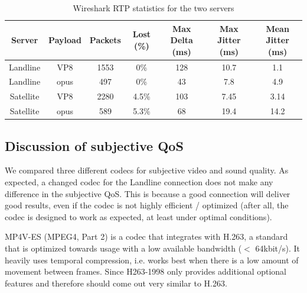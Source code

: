 \documentclass[parskip=full]{scrartcl}
\begin{document}
\begin{table}
    \centering
    \begin{tabular}{c c c c c c c}
       \hline
       Server & Payload & Packets & Lost (\%) & Max Delta (ms) & Max Jitter (ms) & Mean Jitter (ms)\\
       \hline
       Landline & VP8 & 1553 & 0\% & 128 & 10.7 & 1.1 \\
       Landline & opus & 497 & 0\% & 43 & 7.8 & 4.9 \\
       Satellite & VP8 & 2280 & 4.5\% & 103 & 7.45 & 3.14\\
       Satellite & opus & 589 & 5.3\% & 68 & 19.4 & 14.2\\
       \hline
    \end{tabular}
    \caption{Wireshark RTP statistics for the two servers}
    \label{tbl:rtpStatistics}
\end{table}


\subsection{Discussion of subjective QoS}
We compared three different codecs for subjective video and sound quality.
As expected, a changed codec for the Landline connection does not make any difference in the subjective QoS.
This is because a good connection will deliver good results, even if the codec is not highly efficient / optimized (after all, the codec is designed to work as expected, at least under optimal conditions).

MP4V-ES (MPEG4, Part 2) is a codec that integrates with H.263, a standard that is optimized towards usage with a low available bandwidth ($<$ 64kbit/s).
It heavily uses temporal compression, i.e. works best when there is a low amount of movement between frames.
Since H263-1998 only provides additional optional features and therefore should come out very similar to H.263.
\end{document}
